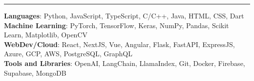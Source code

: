 \documentclass[letterpaper,10pt]{article}
\renewcommand{\section}[1]{
  \vspace{-7pt}{\scshape\raggedright\large #1}\par
  \vspace{1pt}\hrule\vspace{-7pt}
}
\begin{document}
\section{Technical Skills}
 \begin{list}{}{\setlength{\leftmargin}{0.15in}\setlength{\itemsep}{0pt}\setlength{\parsep}{0pt}\setlength{\topsep}{0pt}\setlength{\partopsep}{0pt}}
    \item\small{
     \textbf{Languages}{: Python, JavaScript, TypeScript, C/C++, Java, HTML, CSS, Dart} \\
     \textbf{Machine Learning}{: PyTorch, TensorFlow, Keras, NumPy, Pandas, Scikit Learn, Matplotlib, OpenCV} \\
     \textbf{WebDev/Cloud}{: React, NextJS, Vue, Angular, Flask, FastAPI, ExpressJS, Azure, GCP, AWS, PostgreSQL, GraphQL} \\
     \textbf{Tools and Libraries}{: OpenAI, LangChain, LlamaIndex, Git, Docker, Firebase, Supabase, MongoDB}
    }
 \end{list}


\end{document}
